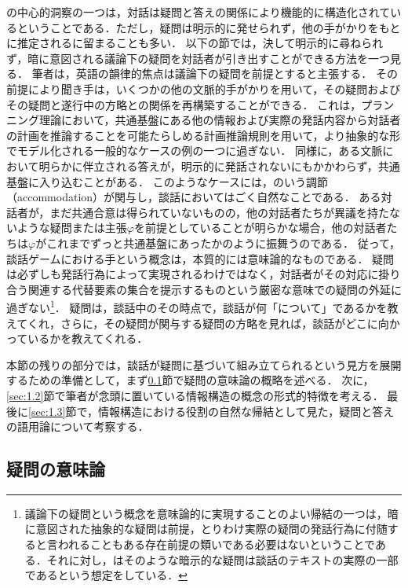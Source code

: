 \documentclass{goken}
\newcommand{\term}[2]{\textsf{#1}（#2）}
\newcommand{\ori}[1]{\noindent\textcolor[gray]{0.7}{\fontsize{8pt}{8pt}\selectfont{\textsf{(p.~#1)}}} }
\begin{document}
\citet{Carlson1982}の中心的洞察の一つは，対話は疑問と答えの関係により機能的に構造化されているということである．ただし，疑問は明示的に発せられず，他の手がかりをもとに推定されるに留まることも多い．
以下の節では，決して明示的に尋ねられず，暗に意図される議論下の疑問を対話者が引き出すことができる方法を一つ見る．
筆者は，英語の韻律的焦点は議論下の疑問を前提とすると主張する．
その前提により聞き手は，いくつかの他の文脈的手がかりを用いて，その疑問およびその疑問と遂行中の方略との関係を再構築することができる．
これは，プランニング理論において，共通基盤にある他の情報および実際の発話内容から対話者の計画を推論することを可能たらしめる計画推論規則を用いて，より抽象的な形でモデル化される一般的なケースの例の一つに過ぎない．
同様に，ある文脈において明らかに伴立される答えが，明示的に発話されないにもかかわらず，共通基盤に入り込むことがある．
このようなケースには，\citet{Lewis1979}のいう\term{調節}{accommodation}が関与し，談話においてはごく自然なことである．
ある対話者が，まだ共通合意は得られていないものの，他の対話者たちが異議を持たないような疑問または主張$\varphi$を前提としていることが明らかな場合，他の対話者たちは$\varphi$がこれまでずっと共通基盤にあったかのように振舞うのである．
従って，談話ゲームにおける手という概念は，本質的には意味論的なものである．
疑問は必ずしも発話行為によって実現されるわけではなく，対話者がその対応に掛り合う関連する代替要素の集合を提示するものという厳密な意味での疑問の外延に過ぎない\footnote{議論下の疑問という概念を意味論的に実現することのよい帰結の一つは，暗に意図された抽象的な疑問は前提，とりわけ実際の疑問の発話行為に付随すると言われることもある存在前提の類いである必要はないということである．それに対し，\citeauthor{Carlson1982}はそのような暗示的な疑問は談話のテキストの実際の一部であるという想定をしている．}．
疑問は，談話中のその時点で，談話が何「について」であるかを教えてくれ，さらに，その疑問が関与する疑問の方略を見れば，談話がどこに向かっているかを教えてくれる．

\ori{9}
本節の残りの部分では，談話が疑問に基づいて組み立てられるという見方を展開するための準備として，まず\ref{sec:1.1}節で疑問の意味論の概略を述べる．
次に，\ref{sec:1.2}節で筆者が念頭に置いている情報構造の概念の形式的特徴を考える．
最後に\ref{sec:1.3}節で，情報構造における役割の自然な帰結として見た，疑問と答えの語用論について考察する．

\subsection{疑問の意味論}\label{sec:1.1}
\end{document}
